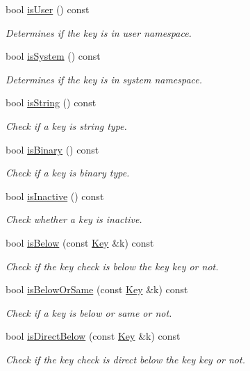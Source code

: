 \begin{DoxyCompactItemize}
bool \hyperlink{classkdb_1_1Key_a3b3d0d74246b259b10caed425216d91c}{is\+User} () const
\begin{DoxyCompactList}\small\item\em Determines if the key is in user namespace. \end{DoxyCompactList}\item 
bool \hyperlink{classkdb_1_1Key_a44833fb97b02ca58205c48d740c4cada}{is\+System} () const
\begin{DoxyCompactList}\small\item\em Determines if the key is in system namespace. \end{DoxyCompactList}\item 
bool \hyperlink{classkdb_1_1Key_a2170b1d9decef951b478454e3ee0b618}{is\+String} () const
\begin{DoxyCompactList}\small\item\em Check if a key is string type. \end{DoxyCompactList}\item 
bool \hyperlink{classkdb_1_1Key_ad748648cb25e2dc77972581e12a5b31c}{is\+Binary} () const
\begin{DoxyCompactList}\small\item\em Check if a key is binary type. \end{DoxyCompactList}\item 
bool \hyperlink{classkdb_1_1Key_a3a27bc4aa9dc8237ce2151ae37fde119}{is\+Inactive} () const
\begin{DoxyCompactList}\small\item\em Check whether a key is inactive. \end{DoxyCompactList}\item 
bool \hyperlink{classkdb_1_1Key_a2ced1c67613e5024f22563318567ed67}{is\+Below} (const \hyperlink{classkdb_1_1Key}{Key} \&k) const
\begin{DoxyCompactList}\small\item\em Check if the key check is below the key key or not. \end{DoxyCompactList}\item 
bool \hyperlink{classkdb_1_1Key_a501eda4871a57faf5f7588a372d8f9c4}{is\+Below\+Or\+Same} (const \hyperlink{classkdb_1_1Key}{Key} \&k) const
\begin{DoxyCompactList}\small\item\em Check if a key is below or same or not. \end{DoxyCompactList}\item 
bool \hyperlink{classkdb_1_1Key_a6b7ce3736c89225445b7cc49d0e62bbe}{is\+Direct\+Below} (const \hyperlink{classkdb_1_1Key}{Key} \&k) const
\begin{DoxyCompactList}\small\item\em Check if the key check is direct below the key key or not. \end{DoxyCompactList}\end{DoxyCompactItemize}



